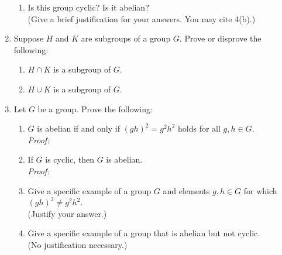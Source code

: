 \documentclass[fleqn,12pt]{article}
\newcommand{\<}{\ensuremath{\langle}}
\renewcommand{\>}{\ensuremath{\rangle}}
\begin{document}
\begin{enumerate}[{\bf 1.}]
\begin{enumerate}
\item Is this group cyclic? Is it abelian?\\
  (Give a brief justification for your answers. You may cite 4(b).)

  \end{enumerate}
\newpage

\item Suppose $H$ and $K$ are subgroups of a group $G$. Prove or disprove the following:
  \begin{enumerate}
  \item $H\cap K$ is a subgroup of $G$.
\vskip11cm
  \item $H\cup K$ is a subgroup of $G$.
  \end{enumerate}
\newpage

\item %
  Let $G$ be a group.  Prove the following:
  \begin{enumerate}
  \item $G$ is abelian if and only if $(gh)^2 = g^2h^2$ holds for all $g, h \in G$. \\
    {\it Proof:}
    \vskip7cm
  \item If $G$ is cyclic, then $G$ is abelian.\\
    {\it Proof:}
    \vskip6cm
  \item Give a specific example of a group $G$ and elements $g, h \in G$ for which $(gh)^2 \neq g^2h^2$. \\
    (Justify your answer.)
    \vskip4cm
  \item Give a specific example of a group that is abelian but not cyclic.\\
    (No justification necessary.)
  \end{enumerate}


\end{enumerate}
\end{document}
